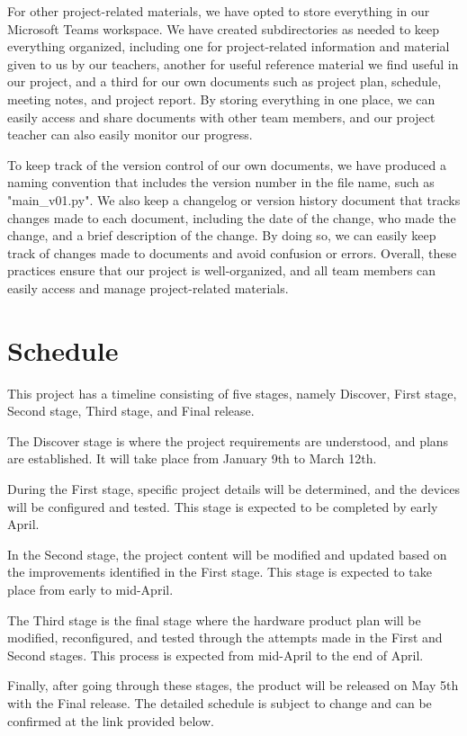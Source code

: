 \documentclass{article}
\begin{document}
For other project-related materials, we have opted to store everything in our Microsoft Teams workspace. We have created subdirectories as needed to keep everything organized, including one for project-related information and material given to us by our teachers, another for useful reference material we find useful in our project, and a third for our own documents such as project plan, schedule, meeting notes, and project report. By storing everything in one place, we can easily access and share documents with other team members, and our project teacher can also easily monitor our progress.

To keep track of the version control of our own documents, we have produced a naming convention that includes the version number in the file name, such as "main\_v01.py". We also keep a changelog or version history document that tracks changes made to each document, including the date of the change, who made the change, and a brief description of the change. By doing so, we can easily keep track of changes made to documents and avoid confusion or errors. Overall, these practices ensure that our project is well-organized, and all team members can easily access and manage project-related materials.

\section{Schedule}

This project has a timeline consisting of five stages, namely Discover, First stage, Second stage, Third stage, and Final release.

The Discover stage is where the project requirements are understood, and plans are established. It will take place from January 9th to March 12th.

During the First stage, specific project details will be determined, and the devices will be configured and tested. This stage is expected to be completed by early April.

In the Second stage, the project content will be modified and updated based on the improvements identified in the First stage. This stage is expected to take place from early to mid-April.

The Third stage is the final stage where the hardware product plan will be modified, reconfigured, and tested through the attempts made in the First and Second stages. This process is expected from mid-April to the end of April.

Finally, after going through these stages, the product will be released on May 5th with the Final release. The detailed schedule is subject to change and can be confirmed at the link provided below.
\end{document}

